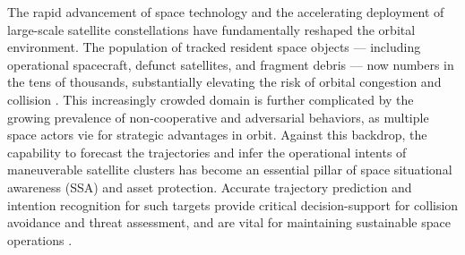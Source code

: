 \documentclass[a4paper,fleqn]{cas-dc}
\begin{document}
The rapid advancement of space technology and the accelerating deployment of large-scale satellite constellations have fundamentally reshaped the orbital environment. The population of tracked resident space objects --- including operational spacecraft, defunct satellites, and fragment debris --- now numbers in the tens of thousands, substantially elevating the risk of orbital congestion and collision \cite{carrillo2024survey}. This increasingly crowded domain is further complicated by the growing prevalence of non-cooperative and adversarial behaviors, as multiple space actors vie for strategic advantages in orbit. Against this backdrop, the capability to forecast the trajectories and infer the operational intents of maneuverable satellite clusters has become an essential pillar of space situational awareness (SSA) and asset protection. Accurate trajectory prediction and intention recognition for such targets provide critical decision-support for collision avoidance and threat assessment, and are vital for maintaining sustainable space operations \cite{carrillo2024survey}.
\end{document}
